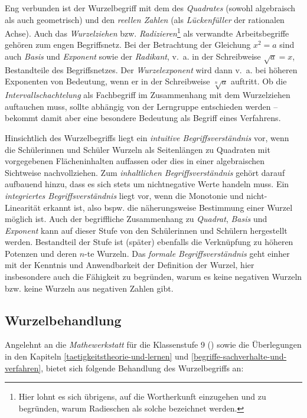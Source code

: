 \documentclass[
]{scrbook}
\theoremstyle{definition}
\theoremstyle{definition}
\theoremstyle{definition}
\theoremstyle{definition}
\theoremstyle{remark}
\begin{document}
Eng verbunden ist der Wurzelbegriff mit dem des \emph{Quadrates} (sowohl algebraisch als auch geometrisch) und den \emph{reellen Zahlen} (als \emph{Lückenfüller} der rationalen Achse). Auch das \emph{Wurzelziehen} bzw. \emph{Radizieren}\footnote{Hier lohnt es sich übrigens, auf die Wortherkunft einzugehen und zu begründen, warum Radieschen als solche bezeichnet werden.} als verwandte Arbeitsbegriffe gehören zum engen Begriffsnetz. Bei der Betrachtung der Gleichung \(x^2 = a\) sind auch \emph{Basis} und \emph{Exponent} sowie der \emph{Radikant}, v.~a. in der Schreibweise \(\sqrt{a} = x\), Bestandteile des Begriffsnetzes. Der \emph{Wurzelexponent} wird dann v.~a. bei höheren Exponenten von Bedeutung, wenn er in der Schreibweise \(\sqrt[n]{a}\) auftritt. Ob die \emph{Intervallschachtelung} als Fachbegriff im Zusammenhang mit dem Wurzelziehen auftauchen muss, sollte abhängig von der Lerngruppe entschieden werden -- bekommt damit aber eine besondere Bedeutung als Begriff eines Verfahrens.

Hinsichtlich des Wurzelbegriffs liegt ein \emph{intuitive Begriffsverständnis} vor, wenn die Schülerinnen und Schüler Wurzeln als Seitenlängen zu Quadraten mit vorgegebenen Flächeninhalten auffassen oder dies in einer algebraischen Sichtweise nachvollziehen. Zum \emph{inhaltlichen Begriffsverständnis} gehört darauf aufbauend hinzu, dass es sich stets um nichtnegative Werte handeln muss. Ein \emph{integriertes Begriffsverständnis} liegt vor, wenn die Monotonie und nicht-Linearität erkannt ist, also bspw. die näherungsweise Bestimmung einer Wurzel möglich ist. Auch der begriffliche Zusammenhang zu \emph{Quadrat}, \emph{Basis} und \emph{Exponent} kann auf dieser Stufe von den Schülerinnen und Schülern hergestellt werden. Bestandteil der Stufe ist (später) ebenfalls die Verknüpfung zu höheren Potenzen und deren \(n\)-te Wurzeln. Das \emph{formale Begriffsverständnis} geht einher mit der Kenntnis und Anwendbarkeit der Definition der Wurzel, hier insbesondere auch die Fähigkeit zu begründen, warum es keine negativen Wurzeln bzw. keine Wurzeln aus negativen Zahlen gibt.

\subsection{Wurzelbehandlung}\label{wurzelbehandlung}

Angelehnt an die \emph{Mathewerkstatt} für die Klassenstufe 9 () sowie die Überlegungen in den Kapiteln \ref{taetigkeitstheorie-und-lernen} und \ref{begriffe-sachverhalte-und-verfahren}, bietet sich folgende Behandlung des Wurzelbegriffs an:
\end{document}

